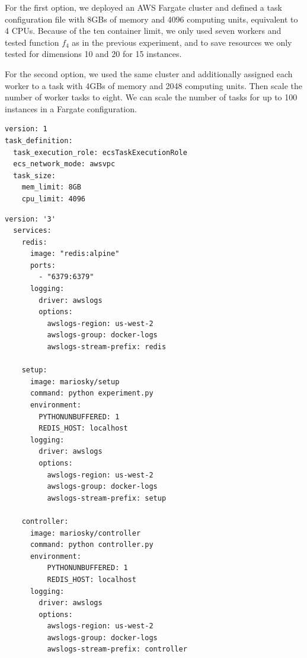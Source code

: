 \documentclass[review]{elsarticle}
\begin{document}
For the first option, we deployed an AWS Fargate cluster and defined a task configuration file with
8GBs of memory and 4096 computing units, equivalent to 4 CPUs. Because of the
ten container limit, we only used seven workers and tested function $f_4$ as
in the previous experiment, and to save resources we only tested for dimensions 10 and 20 for 15 instances.

For the second option, we used the same cluster and additionally
assigned each worker to a task with 4GBs of memory and 2048 computing units. Then scale the 
number of worker tasks to eight. We can scale the number of tasks for up to 100 instances in 
a Fargate configuration. 

\begin{lstlisting}[caption=ecs-params.yml , label=code:ecs]
version: 1
task_definition:
  task_execution_role: ecsTaskExecutionRole
  ecs_network_mode: awsvpc
  task_size:
    mem_limit: 8GB
    cpu_limit: 4096
\end{lstlisting}

\begin{lstlisting}[caption={docker-compose.yml for setup, controller and redis containers}, label=code:compose]
  version: '3'
  services:
    redis:
      image: "redis:alpine"
      ports:
        - "6379:6379"
      logging:
        driver: awslogs
        options:
          awslogs-region: us-west-2
          awslogs-group: docker-logs
          awslogs-stream-prefix: redis
  
    setup:
      image: mariosky/setup
      command: python experiment.py
      environment:
        PYTHONUNBUFFERED: 1
        REDIS_HOST: localhost
      logging:
        driver: awslogs
        options:
          awslogs-region: us-west-2
          awslogs-group: docker-logs
          awslogs-stream-prefix: setup
        
    controller:
      image: mariosky/controller
      command: python controller.py
      environment:
          PYTHONUNBUFFERED: 1
          REDIS_HOST: localhost
      logging:
        driver: awslogs
        options:
          awslogs-region: us-west-2
          awslogs-group: docker-logs
          awslogs-stream-prefix: controller
  \end{lstlisting}
\end{document}
